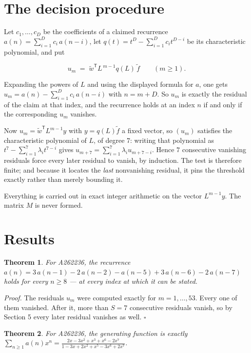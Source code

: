 \documentclass[11pt]{article}
\newtheorem{theorem}{Theorem}
\theoremstyle{definition}
\begin{document}
\section{The decision procedure}

Let $c_1,\dots,c_D$ be the coefficients of a claimed recurrence $a(n) = \sum_{i=1}^{D} c_i\,a(n-i)$, let $q(t) = t^{D} - \sum_{i=1}^{D} c_i t^{D-i}$ be its characteristic polynomial, and put

\[u_m \;=\; \tilde w^{\mathsf T} L^{\,m-1} q(L)\,\tilde f \qquad (m \ge 1).\]

Expanding the powers of $L$ and using the displayed formula for $a$, one gets $u_m = a(n) - \sum_{i=1}^{D} c_i\,a(n-i)$ with $n = m + D$. So $u_m$ is exactly the residual of the claim at that index, and the recurrence holds at an index $n$ if and only if the corresponding $u_m$ vanishes.

Now $u_m = \tilde w^{\mathsf T} L^{m-1} y$ with $y = q(L)\tilde f$ a fixed vector, so $(u_m)$ satisfies the characteristic polynomial of $L$, of degree $7$: writing that polynomial as $t^{7} - \sum_{i=1}^{7} \lambda_i t^{7-i}$ gives $u_{m+7} = \sum_{i=1}^{7} \lambda_i u_{m+7-i}$. Hence $7$ consecutive vanishing residuals force every later residual to vanish, by induction. The test is therefore finite; and because it locates the {\itshape last} nonvanishing residual, it pins the threshold exactly rather than merely bounding it.

Everything is carried out in exact integer arithmetic on the vector $L^{m-1}y$. The matrix $M$ is never formed.

\section{Results}

\begin{theorem} For A262236, the recurrence $a(n) = 3\,a(n-1) - 2\,a(n-2) - a(n-5) + 3\,a(n-6) - 2\,a(n-7)$ holds for every $n \ge 8$ --- at every index at which it can be stated.\end{theorem}

{\itshape Proof.} The residuals $u_m$ were computed exactly for $m = 1,\dots,53$. Every one of them vanished. After it, more than $S = 7$ consecutive residuals vanish, so by Section 5 every later residual vanishes as well. $\square$

\begin{theorem} For A262236, the generating function is exactly $\sum_{n\ge 1} a(n)x^n = \frac{2x - 3x^{2} + x^{3} + x^{6} - 2x^{7}}{1 - 3x + 2x^{2} + x^{5} - 3x^{6} + 2x^{7}}$.\end{theorem}
\end{document}
